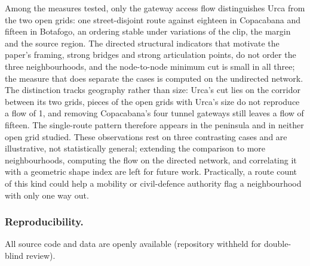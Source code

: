 \documentclass[runningheads]{llncs}
\begin{document}
Among the measures tested, only the gateway access flow distinguishes Urca
from the two open grids: one street-disjoint route against eighteen in
Copacabana and fifteen in Botafogo, an ordering stable under variations of the
clip, the margin and the source region. The directed structural indicators
that motivate the paper's framing, strong bridges and strong articulation
points, do not order the three neighbourhoods, and the node-to-node minimum
cut is small in all three; the measure that does separate the cases is
computed on the undirected network. The distinction tracks geography rather
than size: Urca's cut lies on the corridor between its two grids, pieces of
the open grids with Urca's size do not reproduce a flow of 1, and removing
Copacabana's four tunnel gateways still leaves a flow of fifteen. The
single-route pattern therefore appears in the peninsula and in neither open
grid studied. These observations rest on three contrasting cases and are
illustrative, not statistically general; extending the comparison to more
neighbourhoods, computing the flow on the directed network, and correlating it
with a geometric shape index are left for future work. Practically, a route
count of this kind could help a mobility or civil-defence authority flag a
neighbourhood with only one way out.

\subsubsection*{Reproducibility.} All source code and data are openly
available (repository withheld for double-blind review).



\end{document}
